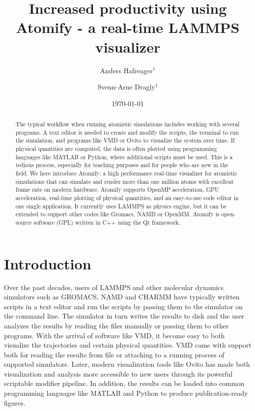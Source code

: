 \documentclass[aps,pre,twocolumn,letterpaper,floatfix,nofootinbib]{revtex4}
\begin{document}
\title{Increased productivity using Atomify - a real-time LAMMPS visualizer}
\author{Anders Hafreager$^1$}
\author{Svenn-Arne Dragly$^{1}$}
\date{\today}


\begin{abstract}
%
The typical workflow when running atomistic simulations includes working with several programs.
A text editor is needed to create and modify the scripts, the terminal to run the simulation, and programs like VMD or Ovito to visualize the system over time.
If physical quantities are computed, the data is often plotted using programming languages like MATLAB or Python,
where additional scripts must be used.
This is a tedious process, especially for teaching purposes and for people who are new in the field.
We here introduce Atomify; a high performance real-time visualizer for atomistic simulations that can simulate and render more than one million atoms with excellent frame rate on modern hardware.
Atomify supports OpenMP acceleration, GPU acceleration, real-time plotting of physical quantities, and an easy-to-use code editor in one single application.
It currently uses LAMMPS as physics engine, but it can be extended to support other codes like Gromacs, NAMD or OpenMM.
Atomify is open-source software (GPL) written in C++ using the Qt framework.
%
\end{abstract}

\maketitle

\section{Introduction}

Over the past decades, users of LAMMPS\citep{Plimpton1995Fast} and other molecular dynamics simulators such as GROMACS, NAMD and CHARMM\citep{berendsen1995gromacs, Phillips2005Scalable, brooks2009charmm} have
typically written scripts in a text editor and run the scripts by passing them to the simulator
on the command line.
The simulator in turn writes the results to disk and the user analyzes the results
by reading the files manually or passing them to other programs.
With the arrival of software like VMD,\citep{Humphrey1996Vmd}
it become easy to both visualize the trajectories and certain physical quantities.
VMD came with support both for reading the results from file or attaching to a
running process of supported simulators.
Later, modern visualization tools like Ovito\citep{Stukowski2009Visualization} has made both visualization and analysis more
accessible to new users through its powerful scriptable modifier pipeline.
In addition, the results can be loaded into common programming languages like MATLAB and Python
to produce publication-ready figures.
\end{document}
